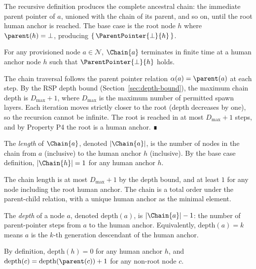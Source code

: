The recursive definition produces the complete ancestral chain: the immediate parent pointer of $a$, unioned with the chain of its parent, and so on, until the root human anchor is reached. The base case is the root node $h$ where $\parent(h) = \bot$, producing $\{\,\ParentPointer{\bot}{h}\,\}$.

\begin{corol}
\label{corol:chain-terminates}
For any provisioned node $a \in \mathcal{N}$, $\Chain{a}$ terminates in finite time at a human anchor node $h$ such that $\ParentPointer{\bot}{h}$ holds.
\end{corol}
\begin{pf}
The chain traversal follows the parent pointer relation $\alpha(a) = \parent(a)$ at each step. By the RSP depth bound (Section~\ref{sec:depth-bound}), the maximum chain depth is $D_{\max} + 1$, where $D_{\max}$ is the maximum number of permitted spawn layers. Each iteration moves strictly closer to the root (depth decreases by one), so the recursion cannot be infinite. The root is reached in at most $D_{\max} + 1$ steps, and by Property P4 the root is a human anchor. ∎
\end{pf}

\begin{dfn}
\label{def:chain-length}
The \emph{length} of $\Chain{a}$, denoted $|\Chain{a}|$, is the number of nodes in the chain from $a$ (inclusive) to the human anchor $h$ (inclusive). By the base case definition, $|\Chain{h}| = 1$ for any human anchor $h$.
\end{dfn}

The chain length is at most $D_{\max} + 1$ by the depth bound, and at least $1$ for any node including the root human anchor. The chain is a total order under the parent-child relation, with a unique human anchor as the minimal element.

\begin{dfn}
\label{def:chain-depth}
The \emph{depth} of a node $a$, denoted $\mathrm{depth}(a)$, is $|\Chain{a}| - 1$: the number of parent-pointer steps from $a$ to the human anchor. Equivalently, $\mathrm{depth}(a) = k$ means $a$ is the $k$-th generation descendant of the human anchor.
\end{dfn}

By definition, $\mathrm{depth}(h) = 0$ for any human anchor $h$, and $\mathrm{depth}(c) = \mathrm{depth}(\parent(c)) + 1$ for any non-root node $c$.

